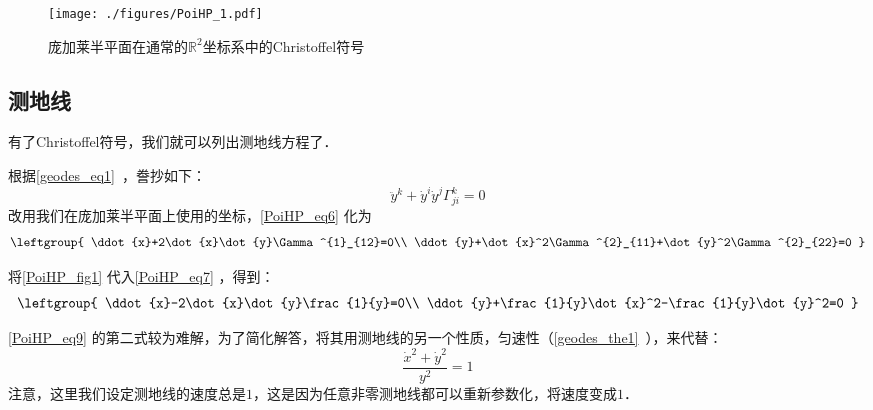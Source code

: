\begin{figure}[ht]
\centering
\texttt{[image: ./figures/PoiHP\_1.pdf]}
\caption{庞加莱半平面在通常的$\mathbb{R}^2$坐标系中的Christoffel符号} \label{PoiHP_fig1}
\end{figure}


\subsection{测地线}

有了Christoffel符号，我们就可以列出测地线方程了．

根据\autoref{geodes_eq1}~，誊抄如下：
\begin{equation}\label{PoiHP_eq6}
\ddot{y}^k+\dot{y}^i\dot{y}^j\Gamma^k_{ji}=0
\end{equation}
改用我们在庞加莱半平面上使用的坐标，\autoref{PoiHP_eq6} 化为
\begin{equation}\label{PoiHP_eq7}
\leftgroup{
    \ddot{x}+2\dot{x}\dot{y}\Gamma^{1}_{12}=0\\
    \ddot{y}+\dot{x}^2\Gamma^{2}_{11}+\dot{y}^2\Gamma^{2}_{22}=0
}
\end{equation}

将\autoref{PoiHP_fig1} 代入\autoref{PoiHP_eq7} ，得到：
\begin{equation}\label{PoiHP_eq9}
\leftgroup{
    \ddot{x}-2\dot{x}\dot{y}\frac{1}{y}=0\\
    \ddot{y}+\frac{1}{y}\dot{x}^2-\frac{1}{y}\dot{y}^2=0
}
\end{equation}

\autoref{PoiHP_eq9} 的第二式较为难解，为了简化解答，将其用测地线的另一个性质，匀速性（\autoref{geodes_the1}~），来代替：
\begin{equation}\label{PoiHP_eq8}
\frac{\dot{x}^2+\dot{y}^2}{y^2}=1
\end{equation}
注意，这里我们设定测地线的速度总是$1$，这是因为任意非零测地线都可以重新参数化，将速度变成$1$．

